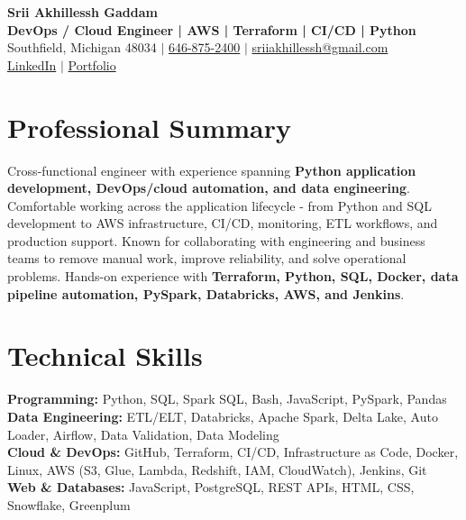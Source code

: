 \documentclass[letterpaper,10pt]{article}
\begin{document}
\fontsize{9.35pt}{10.45pt}\selectfont

\begin{center}
    {\LARGE \textbf{Srii Akhillessh Gaddam}} \\[-1pt]
    \textbf{DevOps / Cloud Engineer | AWS | Terraform | CI/CD | Python} \\[2pt]
    Southfield, Michigan 48034 $|$
    \href{tel:6468752400}{646-875-2400} $|$
    \href{mailto:sriiakhillessh@gmail.com}{sriiakhillessh@gmail.com} \\[1pt]
    \href{https://www.linkedin.com/in/srii-akhiilessh-gaddam-b48668191/}{LinkedIn} $|$
    \href{https://sriiakhillesshg.github.io/portfolio/}{Portfolio}
\end{center}
\vspace{-8pt}

\section{Professional Summary}
\small{Cross-functional engineer with experience spanning \textbf{Python application development, DevOps/cloud automation, and data engineering}. Comfortable working across the application lifecycle - from Python and SQL development to AWS infrastructure, CI/CD, monitoring, ETL workflows, and production support. Known for collaborating with engineering and business teams to remove manual work, improve reliability, and solve operational problems. Hands-on experience with \textbf{Terraform, Python, SQL, Docker, data pipeline automation, PySpark, Databricks, AWS, and Jenkins}.}

\section{Technical Skills}
\small{
\textbf{Programming:} Python, SQL, Spark SQL, Bash, JavaScript, PySpark, Pandas \\
\textbf{Data Engineering:} ETL/ELT, Databricks, Apache Spark, Delta Lake, Auto Loader, Airflow, Data Validation, Data Modeling \\
\textbf{Cloud \& DevOps:} GitHub, Terraform, CI/CD, Infrastructure as Code, Docker, Linux, AWS (S3, Glue, Lambda, Redshift, IAM, CloudWatch), Jenkins, Git \\
\textbf{Web \& Databases:} JavaScript, PostgreSQL, REST APIs, HTML, CSS, Snowflake, Greenplum
}
\end{document}
